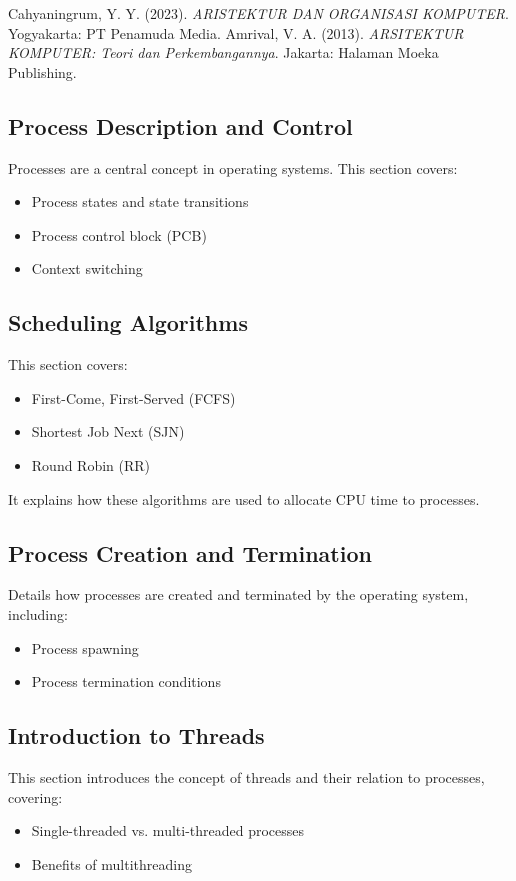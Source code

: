 \documentclass[12pt]{article}
\begin{document}
	\begin{thebibliography}{widestlabel}
		Cahyaningrum, Y. Y. (2023). \textit{ARISTEKTUR DAN ORGANISASI KOMPUTER}. Yogyakarta: PT Penamuda Media.
		Amrival, V. A. (2013). \textit{ARSITEKTUR KOMPUTER: Teori dan Perkembangannya}. Jakarta: Halaman Moeka Publishing.
	\end{thebibliography}
	
	\subsection{Process Description and Control}
	Processes are a central concept in operating systems. This section covers:
	\begin{itemize}
		\item Process states and state transitions
		\item Process control block (PCB)
		\item Context switching
	\end{itemize}
	
	\subsection{Scheduling Algorithms}
	This section covers:
	\begin{itemize}
		\item First-Come, First-Served (FCFS)
		\item Shortest Job Next (SJN)
		\item Round Robin (RR)
	\end{itemize}
	It explains how these algorithms are used to allocate CPU time to processes.
	
	\subsection{Process Creation and Termination}
	Details how processes are created and terminated by the operating system, including:
	\begin{itemize}
		\item Process spawning
		\item Process termination conditions
	\end{itemize}
	
	\subsection{Introduction to Threads}
	This section introduces the concept of threads and their relation to processes, covering:
	\begin{itemize}
		\item Single-threaded vs. multi-threaded processes
		\item Benefits of multithreading
	\end{itemize}
	
\end{document}
